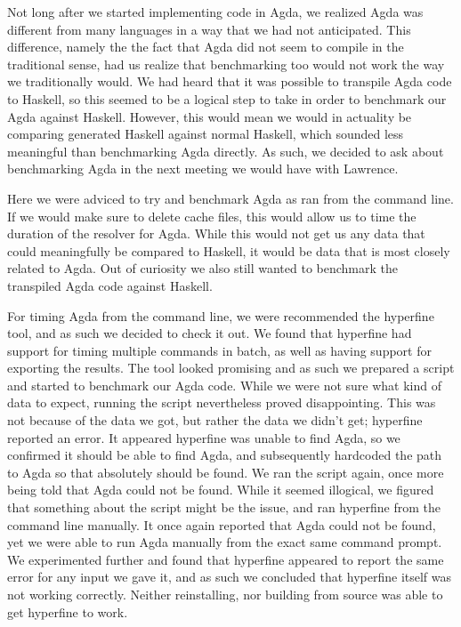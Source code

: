 Not long after we started implementing code in Agda, we realized Agda was different from many languages in a way that we had not anticipated.
This difference, namely the the fact that Agda did not seem to compile in the traditional sense, had us realize that benchmarking too would not work the way we traditionally would.\newline
We had heard that it was possible to transpile Agda code to Haskell, so this seemed to be a logical step to take in order to benchmark our Agda against Haskell.
However, this would mean we would in actuality be comparing generated Haskell against normal Haskell, which sounded less meaningful than benchmarking Agda directly.
As such, we decided to ask about benchmarking Agda in the next meeting we would have with Lawrence.

Here we were adviced to try and benchmark Agda as ran from the command line.
If we would make sure to delete cache files, this would allow us to time the duration of the resolver for Agda.
While this would not get us any data that could meaningfully be compared to Haskell, it would be data that is most closely related to Agda.\newline
Out of curiosity we also still wanted to benchmark the transpiled Agda code against Haskell.

For timing Agda from the command line, we were recommended the hyperfine tool, and as such we decided to check it out.
We found that hyperfine had support for timing multiple commands in batch, as well as having support for exporting the results.
The tool looked promising and as such we prepared a script and started to benchmark our Agda code.\newline
While we were not sure what kind of data to expect, running the script nevertheless proved disappointing.
This was not because of the data we got, but rather the data we didn't get; hyperfine reported an error.
It appeared hyperfine was unable to find Agda, so we confirmed it should be able to find Agda, and subsequently hardcoded the path to Agda so that absolutely should be found.
We ran the script again, once more being told that Agda could not be found.\newline
While it seemed illogical, we figured that something about the script might be the issue, and ran hyperfine from the command line manually.
It once again reported that Agda could not be found, yet we were able to run Agda manually from the exact same command prompt.
We experimented further and found that hyperfine appeared to report the same error for any input we gave it, and as such we concluded that hyperfine itself was not working correctly.
Neither reinstalling, nor building from source was able to get hyperfine to work.

